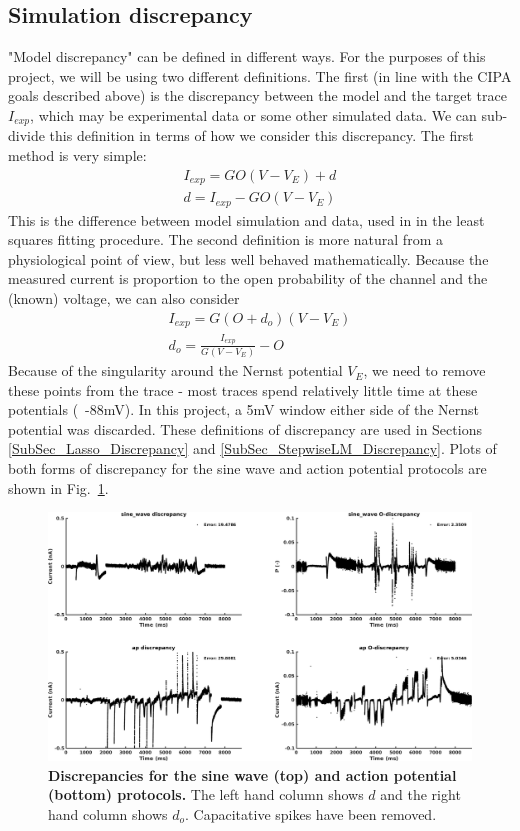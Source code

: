 \documentclass[11pt,a4paper,oneside]{article}
\begin{document}
\subsection{Simulation discrepancy}
"Model discrepancy" can be defined in different ways. For the purposes of this project, we will be using two different definitions. The first (in line with the CIPA goals described above) is the discrepancy between the model and the target trace $I_{exp}$, which may be experimental data or some other simulated data. We can sub-divide this definition in terms of how we consider this discrepancy. The first method is very simple:
\begin{align}
	I_{exp} = G O ( V - V_E ) + d\\
	d = I_{exp} - G O ( V - V_E )
\end{align}
This is the difference between model simulation and data, used in \cite{Beattie2018} in the least squares fitting procedure. The second definition is more natural from a physiological point of view, but less well behaved mathematically. Because the measured current is proportion to the open probability of the channel and the (known) voltage, we can also consider
\begin{align}
	I_{exp} = G ( O + d_o ) ( V - V_E )\\
	d_o = \frac{I_{exp} }{ G( V - V_E ) } - O
\end{align}
Because of the singularity around the Nernst potential $V_E$, we need to remove these points from the trace - most traces spend relatively little time at these potentials (~-88mV). In this project, a 5mV window either side of the Nernst potential was discarded. These definitions of discrepancy are used in Sections \ref{SubSec_Lasso_Discrepancy} and \ref{SubSec_StepwiseLM_Discrepancy}. Plots of both forms of discrepancy for the sine wave and action potential protocols are shown in Fig.~\ref{Fig_Discrepancy}.

\begin{figure}[t]
\begin{center}
\includegraphics[scale=0.42]{Figures/PlotDiscrepancyVsDiscrepancyInOpen_sine_wave_ap.png}
\caption{\textbf{Discrepancies for the sine wave (top) and action potential (bottom) protocols.} The left hand column shows $d$ and the right hand column shows $d_o$. Capacitative spikes have been removed.}
\label{Fig_Discrepancy}
\end{center}
\end{figure}
\end{document}
